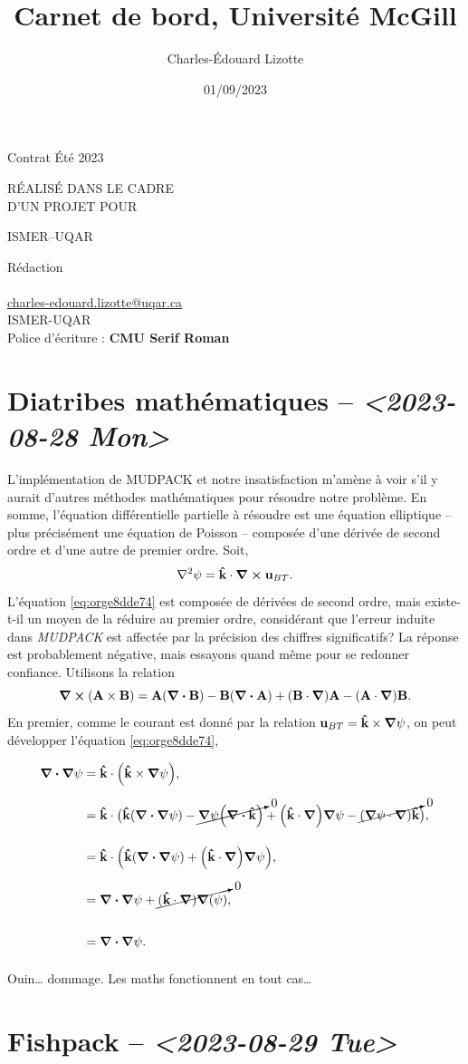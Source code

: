 \documentclass[10pt]{article}
\author{Charles-Édouard Lizotte}
\date{01/09/2023}
\title{Carnet de bord, Université McGill}
\makeatletter
\numberwithin{equation}{section}
\newcommand{\kvf}{\vb{\hat{k}}}
\newcommand{\uu}{\vb{u}}
\newcommand{\venti}{\vphantom{\sum_x^x}}
\newcommand{\mytitlepage}{
\begin{titlepage}
\begin{center}
{\Huge \thesubtitle \par}
\vspace{2cm}
{\Huge \MakeUppercase{\thetitle} \par}
\vspace{2cm}
RÉALISÉ DANS LE CADRE\\ D'UN PROJET POUR \par
\vspace{2cm}
{\Huge ISMER--UQAR \par}
\vspace{2cm}
{\thedate}
\end{center}
\vfill
Rédaction \\
{\theauthor}\\
\url{charles-edouard.lizotte@uqar.ca}\\
ISMER-UQAR\\
Police d'écriture : \textbf{CMU Serif Roman}
\end{titlepage}
}
\newcommand{\thesubtitle}{Contrat Été 2023}
\makeatother
\begin{document}
\mytitlepage
\tableofcontents\newpage
\section{Diatribes mathématiques -- \textit{<2023-08-28 Mon>}}
\label{sec:orga443933}
L'implémentation de MUDPACK et notre insatisfaction m'amène à voir s'il y aurait d'autres méthodes mathématiques pour résoudre notre problème.
En somme, l'équation différentielle partielle à résoudre est une équation elliptique -- plus précisément une équation de Poisson -- composée d'une dérivée de second ordre et d'une autre de premier ordre.
Soit,
\begin{equation}
\label{eq:orge8dde74}
   \laplacian{\psi} = \kvf \cdot \curl{\uu_{BT}}.
\end{equation}
L'équation \ref{eq:orge8dde74} est composée de dérivées de second ordre, mais existe-t-il un moyen de la réduire au premier ordre, considérant que l'erreur induite dans \emph{MUDPACK} est affectée par la précision des chiffres significatifs?
La réponse est probablement négative, mais essayons quand même pour se redonner confiance.
Utilisons la relation
\begin{equation}
   \curl(\vb{A}\times\vb{B}) = \vb{A}\qty(\divergence{\vb{B}}) - \vb{B}\qty(\divergence{\vb{A}}) +\qty(\vb{B}\cdot\gradient)\vb{A} -\qty(\vb{A}\cdot\gradient)\vb{B}.
\end{equation}
En premier, comme le courant est donné par la relation \(\uu_{BT} = \kvf \times \gradient{\psi}\), on peut développer l'équation \ref{eq:orge8dde74},
\begin{align}
   \div{\gradient{\psi}}
   \venti&= \kvf \cdot \qty(\kvf \times \gradient{\psi}),\nonumber \\
   \venti&= \kvf \cdot \big(\kvf\qty(\divergence{\gradient{\psi}}) - \cancelto{0}{\gradient{\psi}\qty(\divergence{\kvf})} + \qty(\kvf\cdot\gradient) \gradient{\psi} - \cancelto{0}{\qty(\gradient{\psi} \cdot\gradient)\kvf} \big),\nonumber\\
   \venti&= \kvf \cdot \qty(\kvf\qty(\divergence{\gradient{\psi}}) + \qty(\kvf\cdot\gradient) \gradient{\psi}),\nonumber\\
   \venti&= \divergence{\gradient{\psi}} + \cancelto{0}{(\kvf\cdot\gradient)\gradient(\psi)},\nonumber\\
   \venti&=\divergence{\gradient{\psi}}.
\end{align}
Ouin\ldots{} dommage. Les maths fonctionnent en tout cas\ldots{}
\section{Fishpack -- \textit{<2023-08-29 Tue>}}
\label{sec:org76ddb41}
\end{document}
